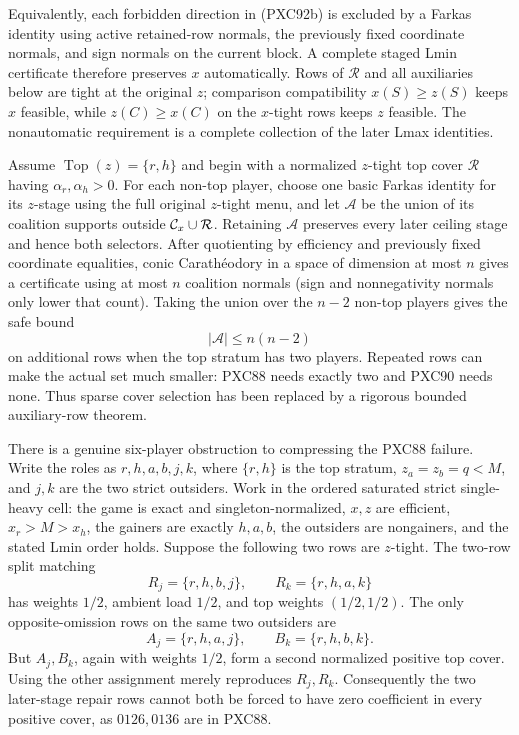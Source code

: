 \documentclass[11pt]{article}
\begin{document}
Equivalently, each forbidden direction in (PXC92b) is excluded by a Farkas
identity using active retained-row normals, the previously fixed coordinate
normals, and sign normals on the current block.  A complete staged Lmin
certificate therefore preserves $x$ automatically.  Rows of $\mathcal R$
and all auxiliaries below are tight at the original $z$; comparison
compatibility $x(S)\ge z(S)$ keeps $x$ feasible, while $z(C)\ge x(C)$ on
the $x$-tight rows keeps $z$ feasible.  The nonautomatic requirement is a
complete collection of the later Lmax identities.

Assume $\operatorname{Top}(z)=\{r,h\}$ and begin with a normalized $z$-tight
top cover $\mathcal R$ having $\alpha_r,\alpha_h>0$.  For each non-top player,
choose one basic Farkas identity for its $z$-stage using the full original
$z$-tight menu, and let $\mathcal A$ be the union of its coalition supports
outside ${\cal C}_x\cup\mathcal R$.  Retaining $\mathcal A$ preserves every
later ceiling stage and hence both selectors.  After quotienting by efficiency
and previously fixed coordinate equalities, conic Carath\'eodory in a space of
dimension at most $n$ gives a certificate using at most $n$ coalition normals
(sign and nonnegativity normals only lower that count).
Taking the union over the $n-2$ non-top players gives the safe bound
\[
 |\mathcal A|\le n(n-2)                              \tag{PXC92c}
\]
on additional rows when the top stratum has two players.  Repeated rows can
make the actual set much smaller: PXC88 needs exactly two and PXC90 needs
none.  Thus sparse cover selection has been replaced by a rigorous bounded
auxiliary-row theorem.

There is a genuine six-player obstruction to compressing the PXC88 failure.
Write the roles as $r,h,a,b,j,k$, where $\{r,h\}$ is the top stratum,
$z_a=z_b=q<M$, and $j,k$ are the two strict outsiders.  Work in the ordered
saturated strict single-heavy cell: the game is exact and
singleton-normalized, $x,z$ are efficient, $x_r>M>x_h$, the gainers are
exactly $h,a,b$, the outsiders are nongainers, and the stated Lmin order
holds.  Suppose the following two rows are $z$-tight.  The two-row split
matching
\[
 R_j=\{r,h,b,j\},\qquad R_k=\{r,h,a,k\}
\]
has weights $1/2$, ambient load $1/2$, and top weights $(1/2,1/2)$.
The only opposite-omission rows on the same two outsiders are
\[
 A_j=\{r,h,a,j\},\qquad B_k=\{r,h,b,k\}.
\]
But $A_j,B_k$, again with weights $1/2$, form a second normalized positive
top cover.  Using the other assignment merely reproduces $R_j,R_k$.
Consequently the two later-stage repair rows cannot both be forced to have
zero coefficient in every positive cover, as $0126,0136$ are in PXC88.
\end{document}

